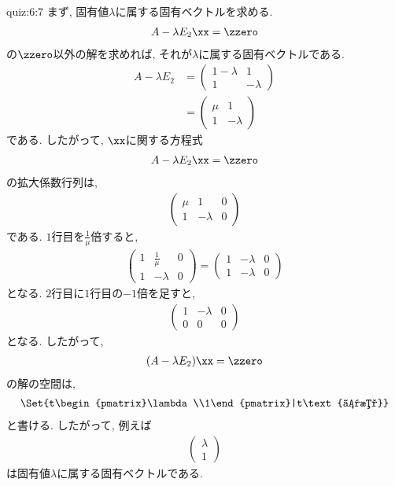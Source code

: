 \begin{answerof}{quiz:6:7}
まず,
固有値$\lambda$に属する固有ベクトルを求める.
\begin{align*}
  A-\lambda E_2 \xx=\zzero 
\end{align*}
の$\zzero$以外の解を求めれば,
それが$\lambda$に属する固有ベクトルである.
\begin{align*}
  A-\lambda E_2
  & =
  \begin{pmatrix}1-\lambda&1\\1&-\lambda\end{pmatrix}  \\
  & =
    \begin{pmatrix}\mu&1\\1&-\lambda\end{pmatrix}
\end{align*}
である. したがって, $\xx$に関する方程式
\begin{align*}
  A-\lambda E_2 \xx=\zzero 
\end{align*}
の拡大係数行列は,
\begin{align*}
  \begin{pmatrix}
   \mu&1&0\\
   1&-\lambda&0
  \end{pmatrix}
\end{align*}
である. $1$行目を$\frac{1}{\mu}$倍すると,
\begin{align*}
  \begin{pmatrix}
    1&\frac{1}{\mu}&0\\
    1&-\lambda&0
  \end{pmatrix}
 =
  \begin{pmatrix}
    1&-\lambda&0\\
    1&-\lambda&0
  \end{pmatrix}
\end{align*}
となる.
$2$行目に$1$行目の$-1$倍を足すと,
\begin{align*}
  \begin{pmatrix}
    1&-\lambda&0\\
    0&0&0
  \end{pmatrix}
\end{align*}
となる.
したがって,
\begin{align*}
  (A-\lambda E_2) \xx=\zzero 
\end{align*}
の解の空間は,
\begin{align*}
\Set{t\begin{pmatrix}\lambda\\1\end{pmatrix}|t\text{は数}}
\end{align*}
と書ける.
したがって, 例えば
\begin{align*}
  \begin{pmatrix}\lambda\\1\end{pmatrix}
\end{align*}
は固有値$\lambda$に属する固有ベクトルである.



\end{answerof}
